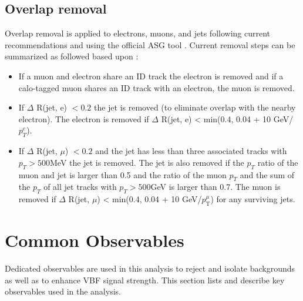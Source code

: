 \subsection{Overlap removal}
Overlap removal is applied to electrons, muons, and jets following current recommendations and using the official ASG tool \cite{Twiki_ASG}. Current removal steps can be summarized as followed based upon \cite{ORpresc,ORpresc_1}:
\begin{itemize}
\item If a muon and electron share an ID track the electron is removed and if a calo-tagged muon shares an ID track with an electron, the muon is removed.
\item If $\Delta$ R(jet, e) $< 0.2$ the jet is removed (to eliminate overlap with the nearby electron). The electron is removed if $\Delta$ R(jet, e) < min(0.4, 0.04 + 10 GeV/$p_T^e$).
\item If $\Delta$ R(jet, $\mu$) $< 0.2$ and the jet has less than three associated tracks with $p_T>500$MeV the jet is removed. The jet is also removed if the $p_T$ ratio of the muon and jet is larger than 0.5 and the ratio of the muon $p_T$ and the sum of the $p_T$ of all jet tracks with $p_T>500$GeV is larger than 0.7. The muon is removed if $\Delta$ R(jet, $\mu$) < min(0.4, 0.04 + 10 GeV/$p_\mathrm{{T}}^{\mu}$) for any surviving jets.
\end{itemize}


\section{Common Observables}

Dedicated observables are used in this analysis to reject and isolate backgrounds as well as to enhance VBF signal strength. This section lists and describe key observables used in the analysis.


